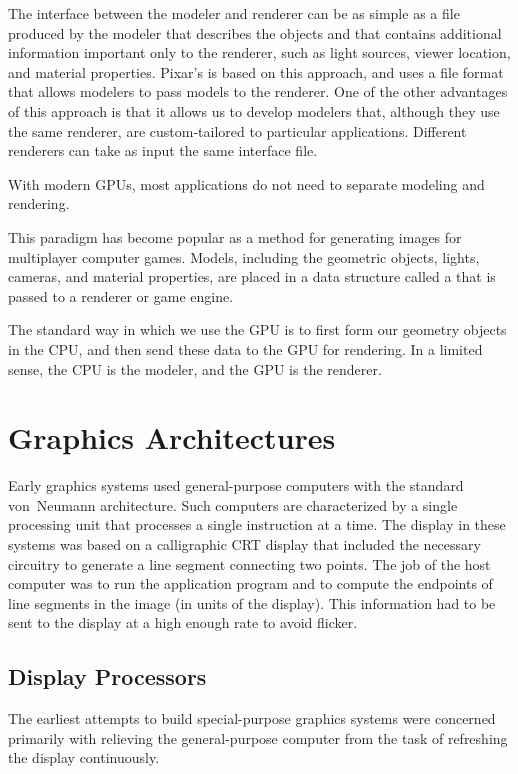 \documentclass[\main/notes.tex]{subfiles}
\begin{document}
        The interface between the modeler and renderer can be
        as simple as a file produced by the modeler that describes the objects
        and that contains additional information important only to the renderer,
        such as light sources, viewer location, and material properties.
        Pixar's  is based on this approach,
        and uses a file format that allows modelers to pass models to the renderer.
        One of the other advantages of this approach is that
        it allows us to develop modelers that,
        although they use the same renderer,
        are custom-tailored to particular applications.
        Different renderers can take as input the same interface file.

        With modern GPUs, most applications do not need to separate modeling and rendering.

        This paradigm has become popular as a method
        for generating images for multiplayer computer games.
        Models, including the geometric objects, lights, cameras, and material properties,
        are placed in a data structure called a 
        that is passed to a renderer or game engine.

        The standard way in which we use the GPU is to
        first form our geometry objects in the CPU,
        and then send these data to the GPU for rendering.
        In a limited sense, the CPU is the modeler, and the GPU is the renderer.

    \section{Graphics Architectures}
      Early graphics systems used general-purpose computers
      with the standard von~Neumann architecture.
      Such computers are characterized by a single processing unit
      that processes a single instruction at a time.
      The display in these systems was based on a calligraphic CRT display
      that included the necessary circuitry to generate a line segment
      connecting two points.
      The job of the host computer was to run the application program
      and to compute the endpoints of line segments in the image
      (in units of the display).
      This information had to be sent to the display at a high enough rate
      to avoid flicker.

      \subsection{Display Processors}
        The earliest attempts to build special-purpose graphics systems
        were concerned primarily with relieving the general-purpose computer
        from the task of refreshing the display continuously.
\end{document}
